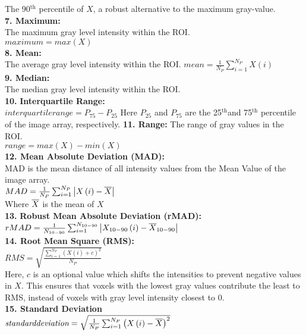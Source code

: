 The 90$^{\mathrm{th}}$ percentile of $X$, a robust alternative to the maximum gray-value. \\
\textbf{7. Maximum:}\\
The maximum gray level intensity within the ROI.\\
$\textit{maximum}=max \left(X\right)$\\
\textbf{8. Mean:}\\
The average gray level intensity within the ROI.\newline
$mean=\frac{1}{N_{P}}\sum _{i=1}^{N_{P}}X\left(i\right)$\\
\textbf{9. Median:}\\
The median gray level intensity within the ROI.\\
\textbf{10.} \textbf{Interquartile Range:}\\
$\textit{interquartilerange}=P_{75}-P_{25}$
Here $P_{25}$ and $P_{75}$ {are the 25}$^{\mathrm{th}}${and 75}$^{\mathrm{th}}$ {percentile of the image array, respectively.}
\textbf{11. Range:}\newline
The range of gray values in the ROI.\\
$\textit{range}=max\left(X\right)-min \left(X\right)$\\
\textbf{12. Mean Absolute Deviation (MAD):}\\
MAD is the mean distance of all intensity values from the Mean Value of the image array.\\
$MAD=\frac{1}{N_{P}}\sum _{i=1}^{N_{P}}\left| X\left(i\right)-\overline{X}\right| $\\
{Where } $\overline{X}$ {is the mean of} $X$\\
\textbf{13.} \textbf{Robust Mean Absolute Deviation (rMAD):}\\
$rMAD=\frac{1}{N_{10-90}}\sum _{i=1}^{N_{10-90}}\left| X_{10-90}\left(i\right)-\overline{X}_{10-90}\right| $\\
\textbf{14. Root Mean Square (RMS):}\\
$RMS=\sqrt{\frac{\sum _{i=1}^{N_{P}}\left(X\left(i\right)+c\right)^{2}}{N_{P}}}$\\
Here, $c$ is an optional value which shifts the intensities to prevent negative values in $X$. This ensures that voxels with the lowest gray values contribute the least to RMS, instead of voxels with gray level intensity closest to 0.\\
\textbf{15. Standard Deviation}\\
$\textit{standarddeviation}=\sqrt{\frac{1}{N_{P}}\sum _{i=1}^{N_{P}}\left(X\left(i\right)-\overline{X}\right)^{2}}$\\
